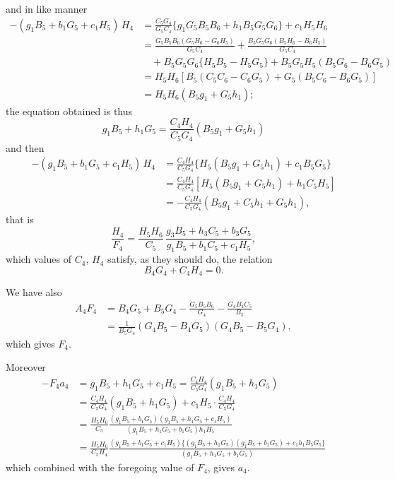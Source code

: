 \documentclass[11pt,a4paper]{article}
\begin{document}
and in like manner
\begin{align*}
-(g_{1}B_{5}+b_{1}G_{5}+c_{1}H_{5})\, H_{4} &= \frac{C_{5}G_{4}}{G_{5}C_{4}}\{g_{1}G_{5}B_{5}B_{6} + h_{1}B_{5}G_{5}G_{6}\} + c_{1}H_{5}H_{6}\\
&= \frac{G_{5}B_{5}B_{6}(G_{5}H_{6}-G_{6}H_{5})}{G_{5}C_{4}} + \frac{B_{5}G_{5}G_{6}(B_{5}H_{6}-B_{6}H_{5})}{G_{5}C_{4}}\\
&\quad + B_{5}G_{5}G_{6}\{H_{5}B_{5} - H_{5}G_{5}\} + B_{5}G_{5}H_{5}(B_{5}G_{6}-B_{6}G_{5})\\
&= H_{5}H_{6}[B_{5}(C_{5}C_{6}-C_{6}G_{5}) + G_{5}(B_{5}C_{6}-B_{6}G_{5})]\\
&= H_{5}H_{6}(B_{5}g_{1}+G_{5}h_{1});
\end{align*}
the equation obtained is thus
\[
g_{1}B_{5}+h_{1}G_{5} = \frac{C_{4}H_{4}}{C_{5}G_{4}}(B_{5}g_{1}+G_{5}h_{1})
\]
and then
\begin{align*}
-(g_{1}B_{5}+b_{1}G_{5}+c_{1}H_{5})\, H_{4} &= \frac{C_{4}H_{4}}{C_{5}G_{4}}\{H_{5}(B_{5}g_{1}+G_{5}h_{1}) + c_{1}B_{5}G_{5}\}\\
&= \frac{C_{4}H_{4}}{C_{5}G_{4}}[H_{5}(B_{5}g_{1}+G_{5}h_{1}) + h_{1}C_{5}H_{5}]\\
&= -\frac{C_{4}H_{4}}{C_{5}G_{4}}(B_{5}g_{1}+C_{5}h_{1}+G_{5}h_{1}),
\end{align*}
that is
\[
\frac{H_{4}}{F_{4}} = \frac{H_{5}H_{6}}{C_{5}}\, \frac{g_{3}B_{5}+h_{3}C_{5}+b_{3}G_{5}}{g_{1}B_{5}+b_{1}C_{5}+c_{1}H_{5}},
\]
which values of $C_{4}$, $H_{4}$ satisfy, as they should do, the relation
\[
B_{4}G_{4} + C_{4}H_{4} = 0.
\]

We have also
\begin{align*}
A_{4}F_{4} &= B_{4}G_{5} + B_{5}G_{4} - \frac{G_{5}B_{5}B_{6}}{G_{4}} - \frac{G_{4}B_{4}C_{5}}{B_{5}}\\
&= \frac{1}{B_{5}G_{4}}(G_{4}B_{5}-B_{4}G_{5})(G_{4}B_{5}-B_{5}G_{4}),
\end{align*}
which gives $F_{4}$.

Moreover
\begin{align*}
-F_{4}a_{4} &= g_{1}B_{5}+h_{1}G_{5}+c_{1}H_{5} = \frac{C_{4}H_{4}}{C_{5}G_{4}}(g_{1}B_{5}+h_{1}G_{5})\\
&= \frac{C_{4}H_{4}}{C_{5}G_{4}}(g_{1}B_{5}+h_{1}G_{5}) + c_{1}H_{5}\cdot\frac{C_{4}H_{4}}{C_{5}G_{4}}\\
&= \frac{H_{5}H_{6}}{C_{5}}\frac{(g_{1}B_{5}+b_{1}G_{5})(g_{1}B_{5}+h_{1}G_{5}+c_{1}H_{5})}{(g_{1}B_{5}+h_{1}G_{5}+b_{1}G_{5})h_{1}H_{5}}\\
&= \frac{H_{5}H_{6}}{C_{5}H_{4}}\frac{(g_{1}B_{5}+b_{1}G_{5}+c_{1}H_{5})\{(g_{1}B_{5}+h_{1}G_{5})(g_{1}B_{5}+b_{1}G_{5})+c_{1}h_{1}B_{5}G_{5}\}}{(g_{1}B_{5}+h_{1}G_{5}+b_{1}G_{5})}
\end{align*}
which combined with the foregoing value of $F_{4}$, gives $a_{4}$.
\end{document}
